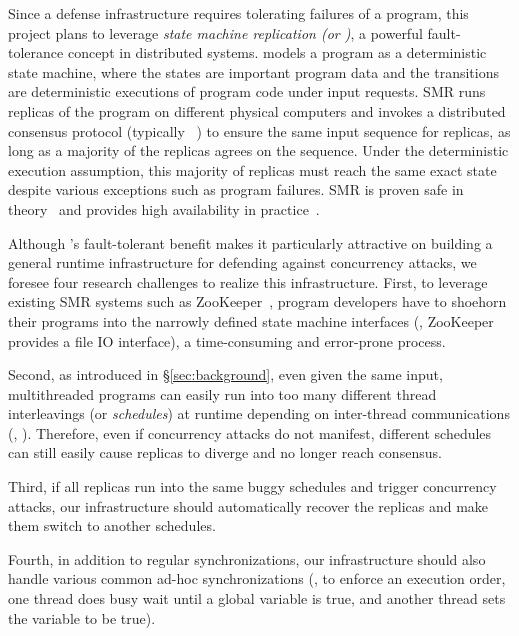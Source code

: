 Since a defense infrastructure requires tolerating failures of a program, 
this project plans to leverage \emph{state machine replication (or \smr)}, a 
powerful fault-tolerance concept in distributed systems. \smr 
models a program as a deterministic state machine, where the states are 
important program data and the transitions are deterministic executions of 
program code under input requests. SMR runs replicas of the program on 
different physical computers and invokes a distributed consensus protocol 
(typically \paxos~\cite{paxos,paxos:simple}) to ensure the same input sequence for replicas, 
as long as a majority of the replicas agrees on the sequence. 
Under the deterministic execution assumption, this majority of replicas must reach 
the same exact state despite various exceptions such as program failures. 
SMR is proven safe in theory~\cite{paxos,paxos:complex} and provides high availability in 
practice~\cite{chubby:osdi,zookeeper}.



Although \smr's fault-tolerant benefit makes it particularly attractive
on building a general runtime infrastructure for defending against 
concurrency attacks, we foresee four research challenges to realize this 
infrastructure. First, to leverage existing SMR systems such as 
ZooKeeper~\cite{zookeeper}, program developers have to shoehorn their programs into the 
narrowly defined state machine interfaces (\eg, ZooKeeper provides a file IO interface), 
a time-consuming and error-prone process.

Second, as introduced in \S\ref{sec:background}, even given the same 
input, multithreaded programs can easily run into too many different thread 
interleavings (or \emph{schedules}) at runtime depending on inter-thread 
communications (\eg, \mutexlock). Therefore, even if concurrency attacks do not 
manifest, different schedules can still easily cause replicas to diverge and no 
longer reach consensus. 


Third, if all replicas run into the same buggy schedules and trigger 
concurrency attacks, our infrastructure should automatically recover the 
replicas and make them switch to another schedules.

Fourth, in addition to regular synchronizations, our infrastructure should also 
handle various common ad-hoc synchronizations (\eg, to enforce an execution order, 
one thread does busy wait until a global variable is true, and another thread sets the 
variable to be true).

